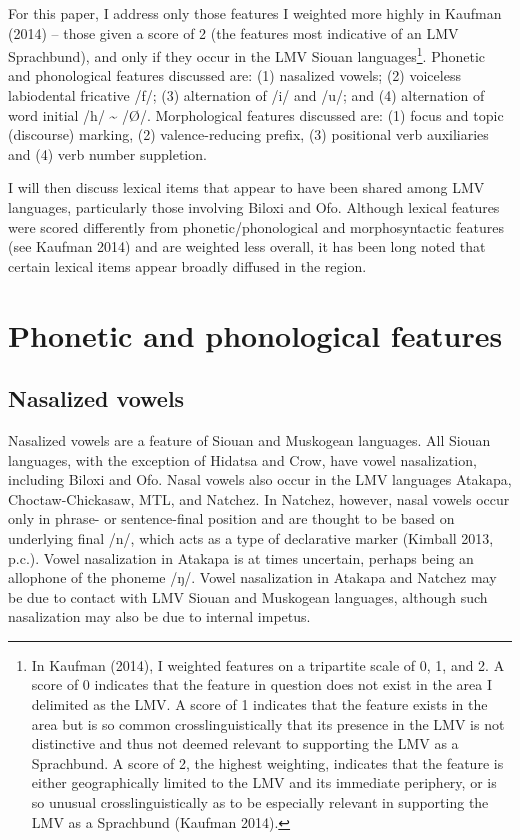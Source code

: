 \documentclass[output=paper]{LSP/langsci}
\begin{document}
For this paper, I address only those features I weighted more highly in Kaufman (2014) -- those given a score of 2 (the features most indicative of an LMV Sprachbund), and only if they occur in the LMV Siouan languages\footnote{In Kaufman (2014), I weighted features on a tripartite scale of 0, 1, and 2. A score of 0 indicates that the feature in question does not exist in the area I delimited as the LMV. A score of 1 indicates that the feature exists in the area but is so common crosslinguistically that its presence in the LMV is not distinctive and thus not deemed relevant to supporting the LMV as a Sprachbund. A score of 2, the highest weighting, indicates that the feature is either geographically limited to the LMV and its immediate periphery, or is so unusual crosslinguistically as to be especially relevant in supporting the LMV as a Sprachbund (Kaufman 2014).}. Phonetic and phonological features discussed are: (1) nasalized vowels; (2) voiceless labiodental fricative /f/; (3) alternation of /i/ and /u/; and (4) alternation of word initial /h/ \textasciitilde{} /Ø/. Morphological features discussed are: (1) focus and topic (discourse) marking, (2) valence-reducing prefix, (3) positional verb auxiliaries and (4) verb number suppletion. 

I will then discuss lexical items that appear to have been shared among LMV languages, particularly those involving Biloxi and Ofo. Although lexical features were scored differently from phonetic/phonological and morphosyntactic features (see Kaufman 2014) and are weighted less overall, it has been long noted that certain lexical items appear broadly diffused in the region. 

\section{Phonetic and phonological features}

\subsection{Nasalized vowels}

Nasalized vowels are a feature of Siouan and Muskogean languages. All Siouan languages, with the exception of Hidatsa and Crow, have vowel nasalization, including Biloxi and Ofo. Nasal vowels also occur in the LMV languages Atakapa, Choctaw-Chickasaw, MTL, and Natchez. In Natchez, however, nasal vowels occur only in phrase- or sentence-final position and are thought to be based on underlying final /n/, which acts as a type of declarative marker (Kimball 2013, p.c.). Vowel nasalization in Atakapa is at times uncertain, perhaps being an allophone of the phoneme /ŋ/. Vowel nasalization in Atakapa and Natchez may be due to contact with LMV Siouan and Muskogean languages, although such nasalization may also be due to internal impetus.
\end{document}
